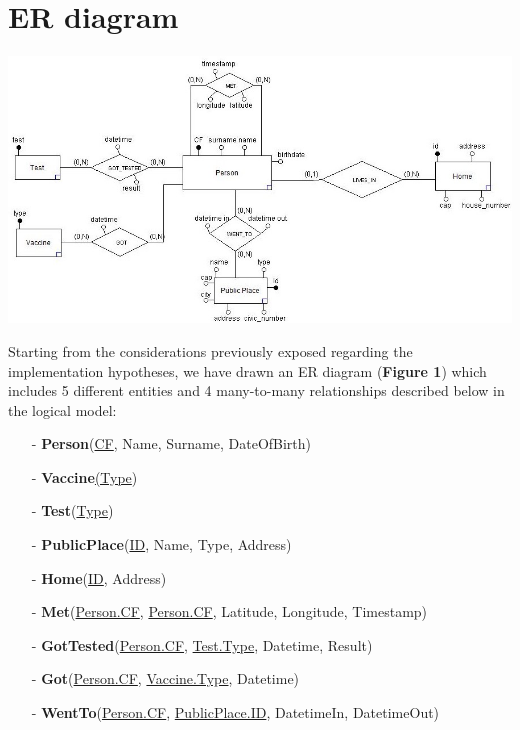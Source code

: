 \documentclass[a4paper,12pt]{article}
\begin{document}
\section{ER diagram}
\paragraph{}
	\begin{center}
 		\includegraphics[width = 15 cm]{ER_diagram.jpg}
	\end{center}
\par Starting from the considerations previously exposed regarding the implementation hypotheses, we have drawn an ER diagram (\textbf{Figure 1}) which includes 5 different entities and 4 many-to-many relationships described below in the logical model: \par
  \begin{itemize}[noitemsep]
   	\item[-]	\textbf{Person}(\underline{CF}, Name, Surname, DateOfBirth)
	\item[-]	\textbf{Vaccine}\underline{(Type})
	\item[-]	\textbf{Test}(\underline{Type})
	\item[-]	\textbf{PublicPlace}(\underline{ID}, Name, Type, Address)
	\item[-]	\textbf{Home}(\underline{ID}, Address)
	\item[-]	\textbf{Met}(\underline{Person.CF}, \underline{Person.CF}, Latitude, Longitude, Timestamp)
	\item[-]	\textbf{GotTested}(\underline{Person.CF}, \underline{Test.Type}, Datetime, Result)
	\item[-]	\textbf{Got}(\underline{Person.CF}, \underline{Vaccine.Type}, Datetime)
	\item[-]	\textbf{WentTo}(\underline{Person.CF}, \underline{PublicPlace.ID}, DatetimeIn, DatetimeOut)
  \end{itemize} \par
\end{document}
